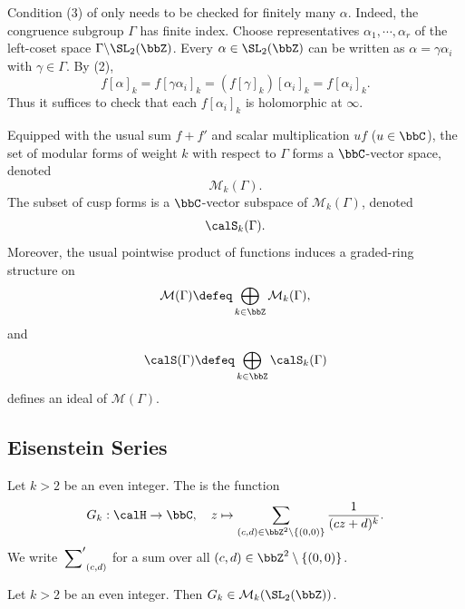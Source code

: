 \begin{remark}
    Condition (3) of  only needs to be checked for finitely many $\alpha$. Indeed, the congruence subgroup $\Gamma$ has finite index. Choose representatives $\alpha_1, \cdots, \alpha_r$ of the left-coset space $\Gamma \backslash \SL_2(\bbZ)$. Every $\alpha \in \SL_2(\bbZ)$ can be written as $\alpha = \gamma\alpha_i$ with $\gamma \in \Gamma$. By (2),
    \[
        f[\alpha]_k = f[\gamma\alpha_i]_k = (f[\gamma]_k)[\alpha_i]_k = f[\alpha_i]_k.
    \]
    Thus it suffices to check that each $f[\alpha_i]_k$ is holomorphic at $\infty$.
\end{remark}

\begin{example}
    Equipped with the usual sum $f + f'$ and scalar multiplication $uf$ ($u \in \bbC$), the set of modular forms of weight $k$ with respect to $\Gamma$ forms a $\bbC$-vector space, denoted
    \[
        \mathcal{M}_k(\Gamma).
    \]
    The subset of cusp forms is a $\bbC$-vector subspace of $\mathcal{M}_k(\Gamma)$, denoted
    \[
        \calS_k(\Gamma).
    \]
    Moreover, the usual pointwise product of functions induces a graded-ring structure on
    \[
        \mathcal{M}(\Gamma) \defeq \bigoplus_{k \in \bbZ}\mathcal{M}_k(\Gamma),
    \]
    and
    \[
        \calS(\Gamma) \defeq \bigoplus_{k \in \bbZ}\calS_k(\Gamma)
    \]
    defines an ideal of $\mathcal{M}(\Gamma)$.

\end{example}

\subsection{Eisenstein Series}\label{Sec:MF_Eisenstein}
\begin{definition}
    Let $k > 2$ be an even integer. The  is the function
    \[
        G_k : \calH \to \bbC, \quad z \mapsto \sum_{(c, d) \in \bbZ^2 \setminus \{(0, 0)\}} \frac{1}{(cz + d)^k}.
    \]
    We write $\sideset{}{'}\sum_{(c, d)}$ for a sum over all $(c, d) \in \bbZ^2 \setminus \{(0, 0)\}$.
\end{definition}

\begin{proposition}\label{Prop:MF_Eisenstein}
    Let $k > 2$ be an even integer. Then $G_k \in \mathcal{M}_k(\SL_2(\bbZ))$.
\end{proposition}

